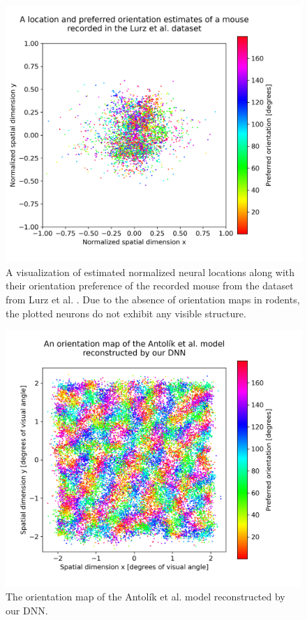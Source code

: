 \begin{figure}[H]\centering
	\includegraphics[width=140mm]{../img/reconstructed_orientation_maps_best_lurz.png}
	\caption{A visualization of estimated normalized neural locations along with their orientation preference of the recorded mouse from the dataset from Lurz et al. \citep{lurz2021generalization}. Due to the absence of orientation maps in rodents, the plotted neurons do not exhibit any visible structure.}
	\label{lurz_ori_maps}
\end{figure}

\begin{figure}[H]\centering
	\includegraphics[width=150mm]{../img/reconstructed_orientation_maps_best_antolik.png}
	\caption{The orientation map of the Antolík et al. model \citep{antolik2019comprehensive} reconstructed by our DNN.}
	\label{prediction}
\end{figure}

